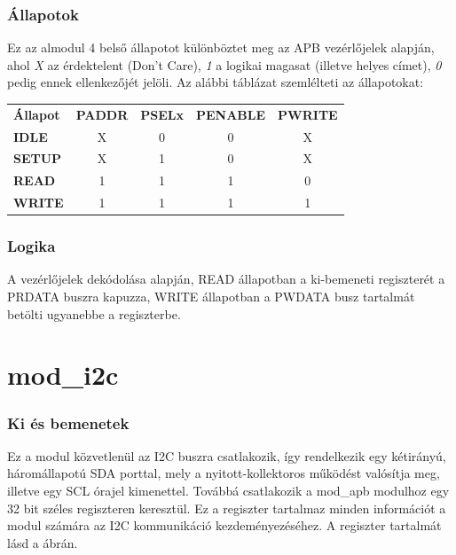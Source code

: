 \subsubsection{Állapotok}
    Ez az almodul 4 belső állapotot különböztet meg az APB vezérlőjelek alapján, ahol \emph{X} az érdektelent (Don't Care), \emph{1}  a logikai magasat (illetve helyes címet), \emph{0}  pedig ennek ellenkezőjét jelöli. Az alábbi táblázat szemlélteti az állapotokat:\\[2ex]

    \begin{tabular}{l|c|c|c|c}
        \textbf{Állapot}& \textbf{PADDR} & \textbf{PSELx} & \textbf{PENABLE}   & \textbf{PWRITE}    \\
        \textbf{IDLE}   &   X            & 0              & 0                  & X                  \\
        \textbf{SETUP}  &   X            & 1              & 0                  & X                  \\
        \textbf{READ}   &   1            & 1              & 1                  & 0                  \\
        \textbf{WRITE}  &   1            & 1              & 1                  & 1
    \end{tabular}

\subsubsection{Logika}
    A vezérlőjelek dekódolása alapján, READ állapotban a ki-bemeneti regiszterét a PRDATA buszra kapuzza, WRITE állapotban a PWDATA busz tartalmát betölti ugyanebbe a regiszterbe.


\section{mod\_i2c}
\subsubsection{Ki és bemenetek}
    Ez a modul közvetlenül az I2C buszra csatlakozik, így rendelkezik egy kétirányú, háromállapotú SDA porttal, mely a nyitott-kollektoros működést valósítja meg, illetve egy SCL órajel kimenettel. Továbbá csatlakozik a mod\_apb modulhoz egy 32 bit széles regiszteren keresztül. Ez a regiszter tartalmaz minden információt a modul számára az I2C kommunikáció kezdeményezéséhez. A regiszter tartalmát lásd a  ábrán.

